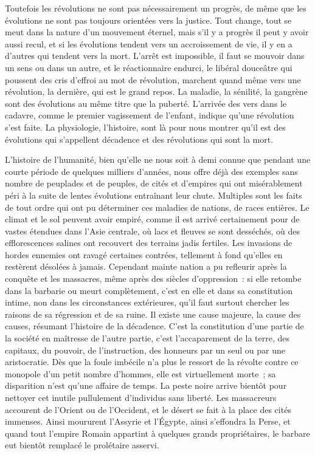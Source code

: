 \documentclass[french,twoside]{book} %
\newcommand\chaptercont{} %
\begin{document}
\chaptercont
\noindent Toutefois les révolutions ne sont pas nécessairement un progrès, de même que les évolutions ne sont pas toujours orientées vers la justice. Tout change, tout se meut dans la nature d’un mouvement éternel, mais s’il y a progrès il peut y avoir aussi recul, et si les évolutions tendent vers un accroissement de vie, il y en a d’autres qui tendent vers la mort. L’arrêt est impossible, il faut  se mouvoir dans un sens ou dans un autre, et le réactionnaire endurci, le libéral douceâtre qui poussent des cris d’effroi au mot de révolution, marchent quand même vers une révolution, la dernière, qui est le grand repos. La maladie, la sénilité, la gangrène sont des évolutions au même titre que la puberté. L’arrivée des vers dans le cadavre, comme le premier vagissement de l’enfant, indique qu’une révolution s’est faite. La physiologie, l’histoire, sont là pour nous montrer qu’il est des évolutions qui s’appellent décadence et des révolutions qui sont la mort.\par
L’histoire de l’humanité, bien qu’elle ne nous soit à demi connue que pendant une courte période de quelques milliers d’années, nous offre déjà des exemples  sans nombre de peuplades et de peuples, de cités et d’empires qui ont misérablement péri à la suite de lentes évolutions entraînant leur chute. Multiples sont les faits de tout ordre qui ont pu déterminer ces maladies de nations, de races entières. Le climat et le sol peuvent avoir empiré, comme il est arrivé certainement pour de vastes étendues dans l’Asie centrale, où lacs et fleuves se sont desséchés, où des efflorescences salines ont recouvert des terrains jadis fertiles. Les invasions de hordes ennemies ont ravagé certaines contrées, tellement à fond qu’elles en restèrent désolées à jamais. Cependant mainte nation a pu refleurir après la conquête et les massacres, même après des siècles d’oppression : si elle retombe dans la  barbarie ou meurt complètement, c’est en elle et dans sa constitution intime, non dans les circonstances extérieures, qu’il faut surtout chercher les raisons de sa régression et de sa ruine. Il existe une cause majeure, la cause des causes, résumant l’histoire de la décadence. C’est la constitution d’une partie de la société en maîtresse de l’autre partie, c’est l’accaparement de la terre, des capitaux, du pouvoir, de l’instruction, des honneurs par un seul ou par une aristocratie. Dès que la foule imbécile n’a plus le ressort de la révolte contre ce monopole d’un petit nombre d’hommes, elle est virtuellement morte ; sa disparition n’est qu’une affaire de temps. La peste noire arrive bientôt pour nettoyer cet inutile pullulement d’individus sans liberté.  Les massacreurs accourent de l’Orient ou de l’Occident, et le désert se fait à la place des cités immenses. Ainsi moururent l’Assyrie et l’Égypte, ainsi s’effondra la Perse, et quand tout l’empire Romain appartint à quelques grands propriétaires, le barbare eut bientôt remplacé le prolétaire asservi.\par
\end{document}
